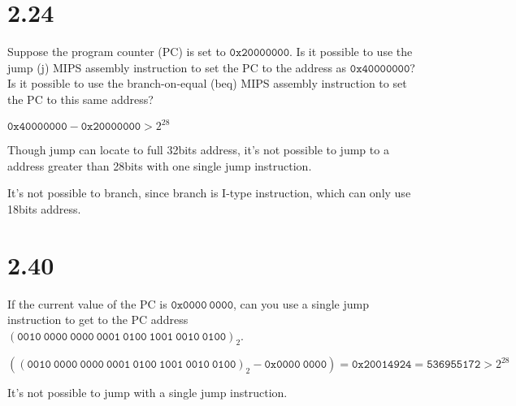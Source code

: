\documentclass[paper=a4, fontsize=11pt]{scrartcl} %
\begin{document}
\maketitle %

\section{2.24}

\begin{fancyquotes}

  Suppose the program counter (PC) is set to $\mathtt{0x2000 0000}$. Is it
  possible to use the jump (j) MIPS assembly instruction to set the PC to the
  address as $\mathtt{0x4000 0000}$? Is it possible to use the branch-on-equal
  (beq) MIPS assembly instruction to set the PC to this same address?

\end{fancyquotes}

$\mathtt{0x4000 0000} - \mathtt{0x2000 0000} > 2^{28}$

Though jump can locate to full 32bits address, it's not possible to jump to a
address greater than 28bits with one single jump instruction.

It's not possible to branch, since branch is I-type instruction, which can only
use 18bits address.


\section{2.40}

\begin{fancyquotes}

  If the current value of the PC is $\mathtt{0x0000\ 0000}$, can you use a
  single jump instruction to get to the PC address $(\mathtt{0010\ 0000\ 0000\
  0001\ 0100\ 1001\ 0010\ 0100})_2$.

\end{fancyquotes}

$((\mathtt{0010\ 0000\ 0000\ 0001\ 0100\ 1001\ 0010\ 0100})_2
- \mathtt{0x0000\ 0000})
= \mathtt{0x20014924}
= \mathtt{536955172}
> 2^{28}$

It's not possible to jump with a single jump instruction.
\end{document}
